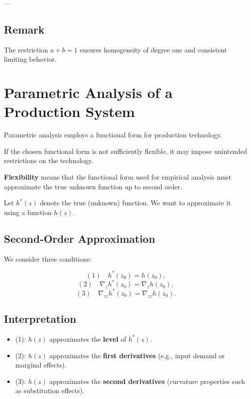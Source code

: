 ---

\subsection*{Remark}

The restriction $a + b = 1$ ensures homogeneity of degree one and
consistent limiting behavior.



\section{Parametric Analysis of a Production System}

Parametric analysis employs a functional form for production technology.

If the chosen functional form is not sufficiently flexible, it may impose
unintended restrictions on the technology.

\medskip

\textbf{Flexibility} means that the functional form used for empirical
analysis must approximate the true unknown function up to second order.

Let $h^*(z)$ denote the true (unknown) function.
We want to approximate it using a function $h(z)$.

\subsection*{Second-Order Approximation}

We consider three conditions:

\[
(1)\quad h^*(z_0) = h(z_0),
\]
\[
(2)\quad \nabla_z h^*(z_0) = \nabla_z h(z_0),
\]
\[
(3)\quad \nabla_{zz} h^*(z_0) = \nabla_{zz} h(z_0).
\]

\subsection*{Interpretation}

\begin{itemize}
    \item (1): $h(z)$ approximates the \textbf{level} of $h^*(z)$.
    \item (2): $h(z)$ approximates the \textbf{first derivatives}
    (e.g., input demand or marginal effects).
    \item (3): $h(z)$ approximates the \textbf{second derivatives}
    (curvature properties such as substitution effects).
\end{itemize}

